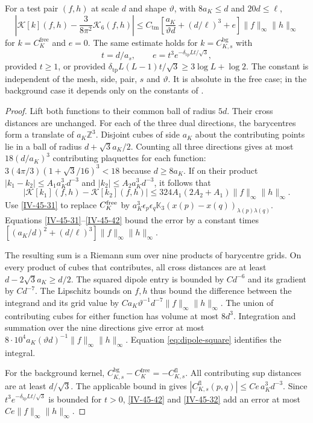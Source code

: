 \documentclass[11pt,letterpaper,reqno]{amsart}
\makeatletter
\theoremstyle{definition}
\newcommand{\ms@minorstart}{%
  \pushQED{\qed}\renewcommand{\qedsymbol}{$\blacksquare$}}
\newenvironment{proposition}[1][]{\ms@minorstart\ms@proposition[#1]}
  {\popQED\endms@proposition}
\theoremstyle{remark}
\makeatother
\begin{document}
\begin{proposition}[The Maxwell comparison]\label{IV-45-38}
For a test pair $(f,h)$ at scale $d$ and shape $\vartheta$,
with $8a_K\le d$ and $20d\le\ell$,
\begin{equation}\label{IV-45-39}
 \left|\mathcal K[k](f,h)-\frac3{8\pi^2}\mathcal K_6(f,h)\right|
 \le C_{\mathrm{tm}}\left[\frac{a_K}{\vartheta d}
                     +(d/\ell)^3+e\right]
                         \|f\|_\infty\|h\|_\infty
\end{equation}
for $k=C_K^{\mathrm{free}}$ and $e=0$. The same estimate holds
for $k=C_{K,s}^{\mathrm{bg}}$ with
\[
 t=d/a_s,\qquad e=t^3e^{-\delta_{\mathrm{tp}}Lt/\sqrt3},
\]
provided $t\ge1$, or provided
$\delta_{\mathrm{tp}}L(L-1)t/\sqrt3\ge3\log L+\log2$.
The constant is independent of the mesh, side, pair, $s$ and
$\vartheta$. It is absolute in the free case; in the background
case it depends only on the constants of \cite[Prop.~7.6]{YMM1}.
\end{proposition}
\begin{proof}
Lift both functions to their common ball of radius $5d$.
Their cross distances are unchanged. For each of the three
dual directions, the barycentres form a translate of
$a_K\mathbb Z^3$. Disjoint cubes of side $a_K$ about the
contributing points lie in a ball of radius
$d+\sqrt3a_K/2$. Counting all three directions gives at most
$18(d/a_K)^3$ contributing plaquettes for each function:
$3(4\pi/3)(1+\sqrt3/16)^3<18$ because $d\ge8a_K$.
If on their product
$|k_1-k_2|\le A_1a_K^3d^{-3}$ and
$|k_2|\le A_2a_K^3d^{-3}$, it follows that
\begin{equation}\label{IV-45-42}
 |\mathcal K[k_1](f,h)-\mathcal K[k_2](f,h)|
 \le324A_1(2A_2+A_1)\|f\|_\infty\|h\|_\infty.
\end{equation}
Use \eqref{IV-45-31} to replace $C^{\rm free}_K$ by
$a_K^3\epsilon_p\epsilon_q\mathbb K_3(x(p)-x(q))_{
\lambda(p)\lambda(q)}$.  Equations
\eqref{IV-45-31}--\eqref{IV-45-42} bound the error by a
constant times $[(a_K/d)^2+(d/\ell)^3]\|f\|_\infty\|h\|_\infty$.

The resulting sum is a Riemann sum over nine products of
barycentre grids.  On every product of cubes that contributes,
all cross distances are at least $d-2\sqrt3a_K\ge d/2$.
The squared dipole entry is bounded by $Cd^{-6}$ and its
gradient by $Cd^{-7}$.  The Lipschitz bounds on $f,h$ thus
bound the difference between the integrand and its grid value
by $Ca_K\vartheta^{-1}d^{-7}\|f\|_\infty\|h\|_\infty$.
The union of contributing cubes for either function has volume
at most $8d^3$.  Integration and summation over the nine
directions give error at most
$8\cdot10^4a_K(\vartheta d)^{-1}\|f\|_\infty\|h\|_\infty$.
Equation \eqref{eq:dipole-square} identifies the integral.

For the background kernel,
$C_{K,s}^{\mathrm{bg}}-C_K^{\mathrm{free}}=-C_{K,s}^{\mathrm{fl}}$.
All contributing sup distances are at least $d/\sqrt3$.
The applicable bound in \cite[Prop.~7.6]{YMM1} gives
$|C_{K,s}^{\mathrm{fl}}(p,q)|\le Ce\,a_K^3d^{-3}$.
Since $t^3e^{-\delta_{\mathrm{tp}}Lt/\sqrt3}$ is bounded for
$t>0$, \eqref{IV-45-42} and \eqref{IV-45-32} add an error
at most $Ce\|f\|_\infty\|h\|_\infty$.
\end{proof}
\end{document}
